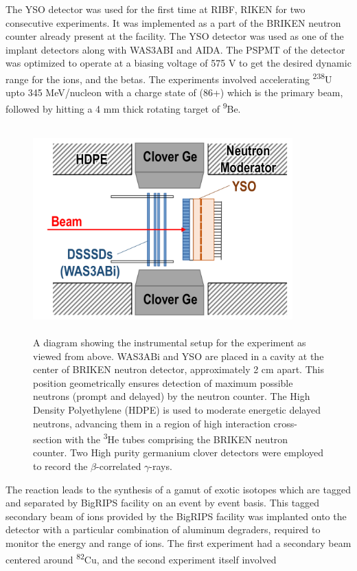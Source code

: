 \documentclass[a4paper,12pt,twoside]{report}
\begin{document}
The YSO detector was used for the first time at RIBF, RIKEN for two consecutive experiments. It was implemented as a part of the BRIKEN \cite{BRIKEN} neutron counter already present at the facility. The YSO detector was used as one of the implant detectors along with WAS3ABI and AIDA. The PSPMT of the detector was optimized to operate at a biasing voltage of 575 V to get the desired dynamic range for the ions, and the betas. The experiments involved accelerating \textsuperscript{238}U upto 345 MeV/nucleon with a charge state of (86+) which is the primary beam, followed by hitting a 4 mm thick rotating target of \textsuperscript{9}Be.
\begin{figure}[h]
    \centering
    \includegraphics[width=10cm,height=8cm]{experimental_setup.png}
    \caption[A diagram showing the instrumental setup for the]{A diagram showing the instrumental setup for the experiment as viewed from above. WAS3ABi and YSO are placed in a cavity at the center of BRIKEN neutron detector, approximately 2 cm apart. This position geometrically ensures detection of maximum possible neutrons (prompt and delayed) by the neutron counter. The High Density Polyethylene (HDPE) is used to moderate energetic delayed neutrons, advancing them in a region of high interaction cross-section with the \textsuperscript{3}He tubes comprising the BRIKEN neutron counter. Two High purity germanium clover detectors were employed to record the $\beta$-correlated $\gamma$-rays.}
    \label{fig:experimental}
\end{figure} 
The reaction leads to the synthesis of a gamut of exotic isotopes which are tagged and separated by BigRIPS facility on an event by event basis. This tagged  secondary beam of ions provided by the BigRIPS facility was implanted onto the detector with a particular combination of aluminum degraders, required to monitor the energy and range of ions. The first experiment had a secondary beam centered around \textsuperscript{82}Cu, and the second experiment itself involved
\end{document}
